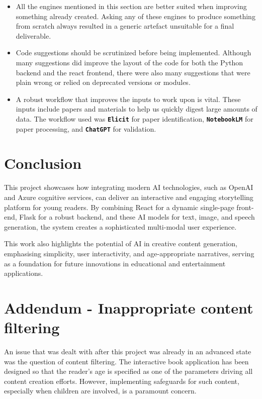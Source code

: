 \documentclass[conference]{IEEEtran}
\begin{document}
	\begin{itemize}
		\item All the engines mentioned in this section are better suited when improving something already created. Asking any of these engines to produce something from scratch always resulted in a generic artefact unsuitable for a final deliverable.
		
		\item Code suggestions should be scrutinized before being implemented. Although many suggestions did improve the layout of the code for both the Python backend and the react frontend, there were also many suggestions that were plain wrong or relied on deprecated versions or modules. 
		
		\item A robust workflow that improves the inputs to work upon is vital. These inputs include papers and materials to help us quickly digest large amounts of data. The workflow used was \textbf{\texttt{Elicit}} for paper identification, \textbf{\texttt{NotebookLM}} for paper processing, and \textbf{\texttt{ChatGPT}} for validation.
	\end{itemize}


	\section{Conclusion}
	
	This project showcases how integrating modern AI technologies, such as OpenAI and Azure cognitive services, can deliver an interactive and engaging storytelling platform for young readers. By combining React for a dynamic single-page front-end, Flask for a robust backend, and these AI models for text, image, and speech generation, the system creates a sophisticated multi-modal user experience. 
	
	This work also highlights the potential of AI in creative content generation, emphasising simplicity, user interactivity, and age-appropriate narratives, serving as a foundation for future innovations in educational and entertainment applications.

	
	\section{Addendum - Inappropriate content filtering}
	
	An issue that was dealt with after this project was already in an advanced state was the question of content filtering. The interactive book application has been designed so that the reader's age is specified as one of the parameters driving all content creation efforts. However, implementing safeguards for such content, especially when children are involved, is a paramount concern.
	
\end{document}
